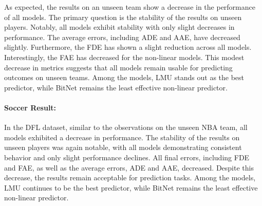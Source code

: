 As expected, the results on an unseen team show a decrease in the performance of all models. The primary question is the stability of the results on unseen players. Notably, all models exhibit stability with only slight decreases in performance. The average errors, including ADE and AAE, have decreased slightly. Furthermore, the FDE has shown a slight reduction across all models. Interestingly, the FAE has decreased for the non-linear models. This modest decrease in metrics suggests that all models remain usable for predicting outcomes on unseen teams. Among the models, LMU stands out as the best predictor, while BitNet remains the least effective non-linear predictor.

\paragraph {Soccer Result:}

In the DFL dataset, similar to the observations on the unseen NBA team, all models exhibited a decrease in performance. The stability of the results on unseen players was again notable, with all models demonstrating consistent behavior and only slight performance declines. All final errors, including FDE and FAE, as well as the average errors, ADE and AAE, decreased. Despite this decrease, the results remain acceptable for prediction tasks. Among the models, LMU continues to be the best predictor, while BitNet remains the least effective non-linear predictor.

